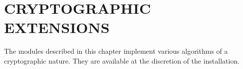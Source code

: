 \chapter{CRYPTOGRAPHIC EXTENSIONS}

The modules described in this chapter implement various algorithms of
a cryptographic nature.  They are available at the discretion of the
installation.
